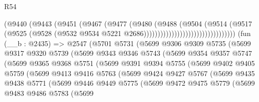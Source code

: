 \begin{lexlean}{R54}
\begin{coremodule}
                                            (@9440
                                              (@9443
                                                (@9451
                                                  (@9467
                                                    (@9477
                                                      (@9480
                                                        (@9488
                                                          (@9504
                                                            (@9514
                                                              (@9517
                                                                (@9525
                                                                  (@9528
                                                                    (@9532
                                                                      @9534
                                                                      @5221
                                                                      @2686)))))))))))))))))))))))))))))))))
    (fun (__b : @2435) =>
    @2547
      (@5701
        @5731
        (@5699
          @9306
          @9309
          @5735
          (@5699
            @9317
            @9320
            @5739
            (@5699
              @9343
              @9346
              @5743
              (@5699
                @9354
                @9357
                @5747
                (@5699
                  @9365
                  @9368
                  @5751
                  (@5699
                    @9391
                    @9394
                    @5755
                    (@5699
                      @9402
                      @9405
                      @5759
                      (@5699
                        @9413
                        @9416
                        @5763
                        (@5699
                          @9424
                          @9427
                          @5767
                          (@5699
                            @9435
                            @9438
                            @5771
                            (@5699
                              @9446
                              @9449
                              @5775
                              (@5699
                                @9472
                                @9475
                                @5779
                                (@5699
                                  @9483
                                  @9486
                                  @5783
                                  (@5699

\end{coremodule}
\end{lexlean}
